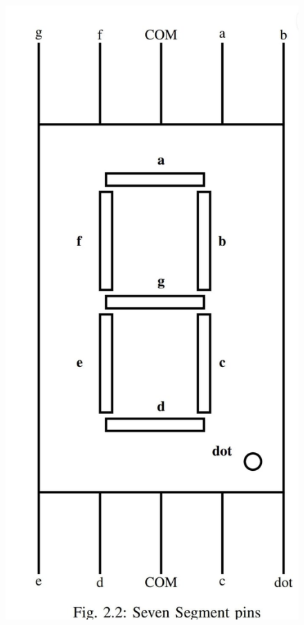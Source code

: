 \documentclass[journal]{IEEEtran}
\begin{document}
\begin{figure}[h]
\begin{minipage}{0.48\textwidth}
        \includegraphics[width=\textwidth]{figs/seven_segment.jpeg}
    \end{minipage}
\end{figure}
\end{document}
